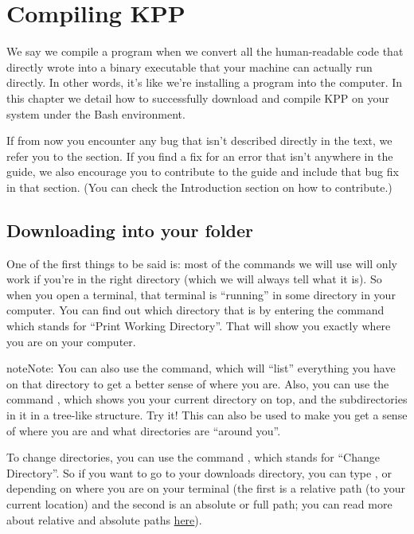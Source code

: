 \documentclass[letterpaper,10pt,openany,oneside]{sphinxmanual}
\begin{document}
\chapter{Compiling KPP}
\label{compiling::doc}\label{compiling:compiling-kpp}
We say we compile a program when we convert all the human-readable code that
directly wrote into a binary executable that your machine can actually run
directly. In other words, it's like we're installing a program into the
computer. In this chapter we detail how to successfully download and compile
KPP on your system under the Bash environment.

If from now you encounter any bug that isn't described directly in the text, we
refer you to the {\hyperref[bugs:bugs]{}} section. If you find a fix for an error that isn't
anywhere in the guide, we also encourage you to contribute to the guide and
include that bug fix in that section. (You can check the Introduction section
on how to contribute.)


\section{Downloading into your folder}
\label{compiling:downloading-into-your-folder}
One of the first things to be said is: most of the commands we will use will
only work if you're in the right directory (which we will always tell what it
is). So when you open a terminal, that terminal is ``running'' in some directory
in your computer.  You can find out which directory that is by entering the
command  which stands for ``Print Working Directory''. That will show you
exactly where you are on your computer.

\begin{notice}{note}{Note:}
You can also use the  command, which will ``list'' everything you have on
that directory to get a better sense of where you are. Also, you can use the
command , which shows you your current directory on top, and
the subdirectories in it in a tree-like structure. Try it! This can also be used
to make you get a sense of where you are and what directories are ``around you''.
\end{notice}

To change directories, you can
use the command , which stands for ``Change Directory''. So if you want to
go to your downloads directory, you can type , or  depending on where you are on your terminal (the first
is a relative path (to your current location) and the second is an absolute or
full path; you can read more about relative and absolute paths \href{https://jeremywsherman.com/blog/2011/09/26/absolute-and-relative-paths/}{here}).
\end{document}
